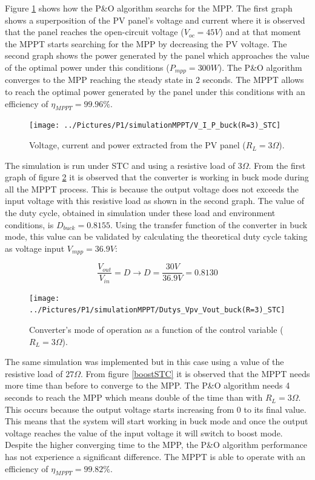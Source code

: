  Figure \ref{buckSTC} shows how the P\&O algorithm searchs for the MPP. The first graph shows a superposition of the PV panel's voltage and current where it is observed that the panel reaches the open-circuit voltage ($V_{oc}=45 V$) and at that moment the MPPT starts searching for the MPP by decreasing the PV voltage. The second graph shows the power generated by the panel which approaches the value of the optimal power under this conditions ($P_{mpp}=300 W$). The P\&O algorithm converges to the MPP reaching the steady state in 2 seconds. The MPPT allows to reach the optimal power generated by the panel under this conditions with an efficiency of $\eta_{MPPT} = 99.96\% $.
\begin{figure}[H]
	\begin{center}
		\texttt{[image: ../Pictures/P1/simulationMPPT/V\_I\_P\_buck(R=3)\_STC]}
		\caption{Voltage, current and power extracted from the PV panel ($R_{L}=3\Omega$).}
		\label{buckSTC} 
	\end{center}	
\end{figure}

The simulation is run under STC and using a resistive load of $3\Omega$. From the first graph of figure \ref{buckSTC_duty} it is observed that the converter is working in buck mode during all the MPPT process. This is because the output voltage does not exceeds the input voltage with this resistive load as shown in the second graph. The value of the duty cycle, obtained in simulation under these load and environment conditions, is $D_{buck}= 0.8155$. Using the transfer function of the converter in  buck mode, this value can be validated by calculating the theoretical duty cycle taking as voltage input $V_{mpp}=36.9 V$: 

\begin{equation}\label{buckmodeTF}
\frac{V_{out}}{V_{in}} = D  \rightarrow D = \frac{30V}{36.9V}= 0.8130 
\end{equation}


\begin{figure}[H]
	\begin{center}
		\texttt{[image: ../Pictures/P1/simulationMPPT/Dutys\_Vpv\_Vout\_buck(R=3)\_STC]}
		\caption{Converter's mode of operation as a function of the control variable ($R_{L}=3\Omega$).}
		\label{buckSTC_duty} 
	\end{center}	
\end{figure}

The same simulation was implemented but in this case using a value of the resistive load of $27\Omega$. From figure \ref{boostSTC} it is observed that the MPPT needs more time than before to converge to the MPP. The P\&O algorithm needs 4 seconds to reach the MPP which means double of the time than with $R_{L}=3\Omega$. This occurs because the output voltage starts increasing from 0 to its final value. This means that the system will start working in buck mode and once the output voltage reaches the value of the input voltage it will switch to boost mode. Despite the higher converging time to the MPP, the P\&O algorithm performance has not experience a significant difference. The MPPT is able to operate with an efficiency of $\eta_{MPPT} = 99.82\% $.


